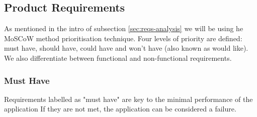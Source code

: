 \subsection{Product Requirements}\label{sec:reqs}
As mentioned in the intro of subsection \ref{sec:reqs-analysis} we will be using he MoSCoW method prioritisation technique. Four levels of priority are defined: must have, should have, could have and won't have (also known as would like). We also differentiate between functional and non-functional requirements. 

\subsubsection {Must Have}
Requirements labelled as "must have" are key to the minimal performance of the application If they are not met, the application can be considered a failure.

